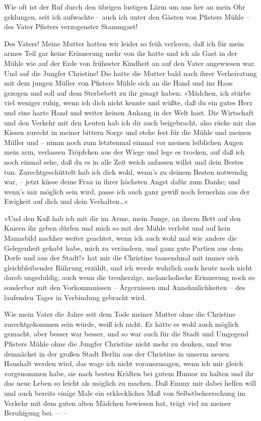 Wie oft ist der Ruf durch den übrigen lustigen Lärm um uns her an
mein Ohr geklungen, seit ich aufwachte – auch ich unter den Gästen
von Pfisters Mühle – des Vater Pfisters verzogenster Stammgast!

Des Vaters! Meine Mutter hatten wir leider so früh verloren, daß
ich für mein armes Teil gar keine Erinnerung mehr von ihr hatte und
ich als Gast in der Mühle wie auf der Erde von frühester Kindheit
an auf den Vater angewiesen war. Und auf die Jungfer Christine! Die
hatte die Mutter bald nach ihrer Verheiratung mit dem jungen Müller
von Pfisters Mühle sich an die Hand und ins Haus gezogen und soll
auf dem Sterbebett zu ihr gesagt haben: »Mädchen, ich stürbe viel
weniger ruhig, wenn ich dich nicht kennte und wüßte, daß du ein
gutes Herz und eine harte Hand und weiter keinen Anhang in der Welt
hast. Die Wirtschaft und den Verkehr mit den Leuten hab ich dir
auch beigebracht, also rücke mir das Kissen zurecht in meiner
bittern Sorge und stehe fest für die Mühle und meinen Müller und –
nimm noch zum letztenmal einmal vor meinen leiblichen Augen mein
arm, verlassen Tröpfchen aus der Wiege und lege es trocken, auf daß
ich noch einmal sehe, daß du es in alle Zeit weich anfassen willst
und dein Bestes tun. Zurechtgeschüttelt hab ich dich wohl, wenn's
zu deinem Besten notwendig war, – jetzt küsse deine Frau in ihrer
höchsten Angst dafür zum Danke; und wenn's mir möglich sein wird,
passe ich auch ganz gewiß noch fernerhin aus der Ewigkeit auf dich
und dein Verhalten\ldots{}«

»Und den Kuß hab ich mit dir im Arme, mein Junge, an ihrem Bett auf
den Knieen ihr geben dürfen und mich so mit der Mühle verlobt und
auf kein Mannsbild nachher weiter geachtet, wenn ich auch wohl mal
wie andere die Gelegenheit gehabt habe, mich zu verändern, und ganz
gute Partien aus dem Dorfe und aus der Stadt!« hat mir die
Christine tausendmal mit immer sich gleichbleibender Rührung
erzählt, und ich werde wahrlich auch heute noch nicht darob
ungeduldig, auch wenn die treuherzige, melancholische Erinnerung
noch so sonderbar mit den Vorkommnissen – Ärgernissen und
Annehmlichkeiten – des laufenden Tages in Verbindung gebracht
wird.

Wie mein Vater die Jahre seit dem Tode meiner Mutter ohne die
Christine zurechtgekommen sein würde, weiß ich nicht. Er hätte es
wohl auch möglich gemacht, aber besser war besser, und so war auch
für die Stadt und Umgegend Pfisters Mühle ohne die Jungfer
Christine nicht mehr zu denken, und was demnächst in der großen
Stadt Berlin aus der Christine in unserm neuen Haushalt werden
wird, das wage ich nicht vorauszusagen, wenn ich mir gleich
vorgenommen habe, sie nach besten Kräften bei gutem Humor zu halten
und ihr das neue Leben so leicht als möglich zu machen. Daß Emmy
mir dabei helfen will und auch bereits einige Male ein
erkleckliches Maß von Selbstbeherrschung im Verkehr mit dem guten
alten Mädchen bewiesen hat, trägt viel zu meiner Beruhigung
bei.~–~–

